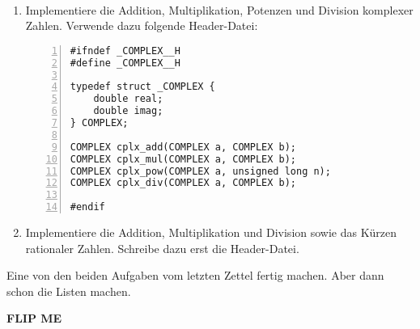 \documentclass{uebungszettel}
\begin{document}
\newcommand{\ah}[2]{\ \\* \emph{(#1, #2)}\\}
\newcommand{\power}{\mathrm{power}}




\begin{aufg}
~\begin{enumerate}
\item
Implementiere die Addition, Multiplikation, Potenzen und Division komplexer Zahlen. Verwende dazu folgende Header-Datei:
\begin{codelisting}
\begin{lstlisting}[numbers=left,numberstyle=\tiny,frame=tlrb]
#ifndef _COMPLEX__H
#define _COMPLEX__H

typedef struct _COMPLEX {
	double real;
	double imag;
} COMPLEX;

COMPLEX cplx_add(COMPLEX a, COMPLEX b);
COMPLEX cplx_mul(COMPLEX a, COMPLEX b);
COMPLEX cplx_pow(COMPLEX a, unsigned long n);
COMPLEX cplx_div(COMPLEX a, COMPLEX b);

#endif
\end{lstlisting}
\end{codelisting}
\item Implementiere die Addition, Multiplikation und Division sowie das Kürzen rationaler Zahlen. Schreibe dazu erst die Header-Datei.
\end{enumerate}
\end{aufg}


\begin{aufg}
Eine von den beiden Aufgaben vom letzten Zettel fertig machen. Aber dann schon die Listen machen.
\end{aufg}

\vfil
\begin{center}\bf FLIP ME\end{center}
\vfil\newpage
\end{document}
